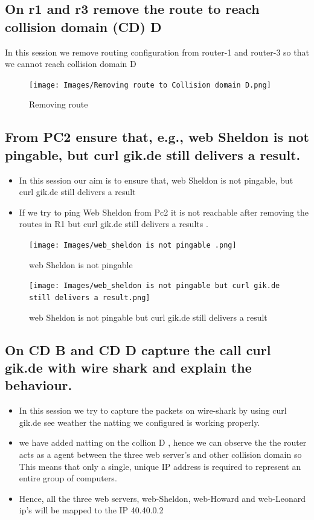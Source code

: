 \subsection{On r1 and r3 remove the route to reach collision domain (CD) D}
In this session we remove routing configuration from router-1 and router-3 so that we cannot reach collision domain D
\begin{figure}[H]
\centering
  \texttt{[image: Images/Removing route to Collision domain D.png]}
  \caption{Removing route}
  \label{fig }
\end{figure}

\subsection{From PC2 ensure that, e.g., web Sheldon is not pingable, but curl gik.de still delivers a result.}
\begin{itemize}
\item In this session our aim is to ensure that, web Sheldon is not pingable, but curl gik.de still delivers a result

\item If we try to ping Web Sheldon from Pc2 it is not reachable after removing the routes in R1 but curl gik.de still delivers a results .
\end{itemize}

\begin{figure}[H]
\centering
  \texttt{[image: Images/web\_sheldon is not pingable .png]}
  \caption{web Sheldon is not pingable}
  \label{fig }
\end{figure}

\begin{figure}[H]
\centering
  \texttt{[image: Images/web\_sheldon is not pingable but curl gik.de still delivers a result.png]}
  \caption{web Sheldon is not pingable but curl gik.de still delivers a result}
  \label{fig }
\end{figure}

\subsection{On CD B and CD D capture the call curl gik.de with wire shark and explain
the behaviour.}
\begin{itemize}
\item In this session we try to capture the packets on wire-shark by using curl gik.de see weather the natting we configured is working properly.
\item we have added natting on the collion D , hence we can observe the the router acts as a agent between the three web server's and other collision domain so This means that only a single, unique IP address is required to represent an entire group of computers.
\item Hence, all the three web servers, web-Sheldon, web-Howard and web-Leonard ip's will be mapped to the IP 40.40.0.2
\end{itemize}

